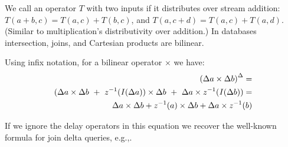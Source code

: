 We call an operator $T$ with two inputs  if it
distributes over stream addition: $T(a+b, c) = T(a, c) + T(b, c)$, and
$T(a, c+d) = T(a, c) + T(a, d)$.  (Similar to multiplication's
distributivity over addition.)  In databases intersection, joins, and
Cartesian products are bilinear.

Using infix notation, for a bilinear operator $\times$ we have:
\begin{eqnarray*}
{(\Delta a \times \Delta b)}^{\Delta} = \\
(\Delta a \times \Delta b ~+~ z^{-1}(\mathit{I}(\Delta a)) \times
\Delta b ~+~ \Delta a \times z^{-1}(\mathit{I}(\Delta b)) = \\
\Delta a \times \Delta b + z^{-1}(a) \times \Delta b + \Delta a \times z^{-1}(b)
\end{eqnarray*}

If we ignore the delay operators in this equation we recover the
well-known formula for join delta queries, e.g.,\cite{koch-pods10}.

